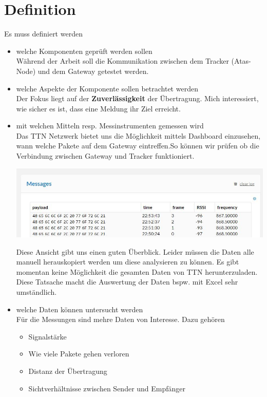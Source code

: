 \documentclass[11pt,english,german]{report}
\theoremstyle{definition}
\begin{document}
\section{Definition}
Es muss definiert werden
\begin{itemize}
	\item welche Komponenten geprüft werden sollen\\[0.3cm]
	Während der Arbeit soll die Kommunikation zwischen dem Tracker (Atas-Node) und dem Gateway getestet werden.
	\item welche Aspekte der Komponente sollen betrachtet werden\\[0.3cm]
	Der Fokus liegt auf der \textbf{Zuverlässigkeit} der Übertragung. Mich interessiert, wie sicher es ist, dass eine Meldung ihr Ziel erreicht. 
	\item mit welchen Mitteln resp. Messinstrumenten gemessen wird\\[0.3cm]	
	Das TTN Netzwerk bietet uns die Möglichkeit mittels Dashboard einzusehen, wann welche Pakete auf dem Gateway eintreffen.So können wir prüfen ob die Verbindung zwischen Gateway und Tracker funktioniert. \\
	
	\begin{minipage}{\linewidth}
		\centering
		\includegraphics[width=\linewidth]{img/ttn/ttn_messages}
	\end{minipage}

	Diese Ansicht gibt uns einen guten Überblick. Leider müssen die Daten alle manuell herauskopiert werden um diese analysieren zu können. Es gibt momentan keine Möglichkeit die gesamten Daten von TTN herunterzuladen. Diese Tatsache macht die Auswertung der Daten bspw. mit Excel sehr umständlich.
	
	\item welche Daten können untersucht werden\\[0.3cm]
	Für die Messungen sind mehre Daten von Interesse. Dazu gehören 
	\begin{itemize}
		\item Signalstärke
		\item Wie viele Pakete gehen verloren
		\item Distanz der Übertragung
		\item Sichtverhältnisse zwischen Sender und Empfänger
	\end{itemize}
\end{itemize}
\end{document}
